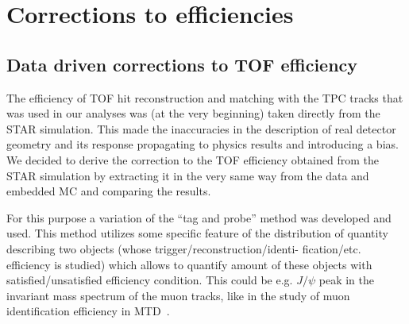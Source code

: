 

\chapter{Corrections to efficiencies}\label{chap:tpcTofEffCorr}

\section{Data driven corrections to TOF efficiency}\label{sec:tofAbsEffCorr}

The efficiency of TOF hit reconstruction and matching with the TPC tracks that was used in our analyses was (at the very beginning) taken directly from the STAR simulation. This made the inaccuracies in the description of real detector geometry and its response propagating to physics results and introducing a bias. We decided to derive the correction to the TOF efficiency obtained from the STAR simulation by extracting it in the very same way from the data and embedded MC and comparing the results.%


For this purpose a variation of the ``tag and probe'' method was developed and used. This method utilizes some specific feature of the distribution of quantity describing two objects (whose trigger/reconstruction/identi- fication/etc. efficiency is studied) which allows to quantify amount of these objects with satisfied/unsatisfied efficiency condition. This could be e.g. $J/\psi$ peak in the invariant mass spectrum of the muon tracks, like in the study of muon identification efficiency in MTD~\cite{Huang:2016dbm}. %

